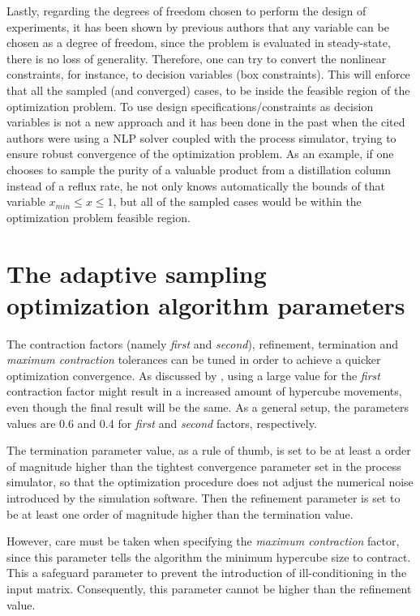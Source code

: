 \documentclass[../msc-thesis.tex]{subfiles}
\begin{document}
Lastly, regarding the degrees of freedom chosen to perform the design of 
experiments, it has been shown by previous authors \textcite{Hori2005,
Kariwala2008} that any variable can be chosen as a degree of freedom, since 
the problem is evaluated in steady-state, there is no loss of generality.
Therefore, one can try to convert the nonlinear constraints, for instance, 
to decision variables (box constraints). This will enforce that all the sampled 
(and converged) cases, to be inside the feasible region of the optimization 
problem. To use design specifications/constraints as decision variables is 
not a new approach and it has been done in the past \textcite{Gera2013,
Jagtap2013} when the cited authors were using a NLP solver coupled with the 
process simulator, trying to ensure robust convergence of the optimization 
problem. As an example, if one chooses to sample the purity of a valuable 
product from a distillation column instead of a reflux rate, he not only 
knows automatically the bounds of that variable $x_{min} \leq x \leq 1$, but 
all of the sampled cases would be within the optimization problem feasible 
region.

\section{The adaptive sampling optimization algorithm parameters}

The contraction factors (namely \textit{first} and \textit{second}), 
refinement, termination and \textit{maximum contraction} tolerances can be 
tuned in order to achieve a quicker optimization convergence. As discussed by 
\textcite{Caballero2008}, using a large value for the \textit{first} 
contraction factor might result in a increased amount of hypercube movements, 
even though the final result will be the same. As a general setup, the 
parameters values are 0.6 and 0.4 for \textit{first} and \textit{second} 
factors, respectively.

The termination parameter value, as a rule of thumb, is set to be at least a 
order of magnitude higher than the tightest convergence parameter set in the 
process simulator, so that the optimization procedure does not adjust the 
numerical noise introduced by the simulation software. Then the refinement 
parameter is set to be at least one order of magnitude higher than the 
termination value.

However, care must be taken when specifying the \textit{maximum contraction} 
factor, since this parameter tells the algorithm the minimum hypercube size to 
contract. This a safeguard parameter to prevent the introduction of 
ill-conditioning in the \kriging input matrix. Consequently, this parameter 
cannot be higher than the refinement value.
\end{document}
